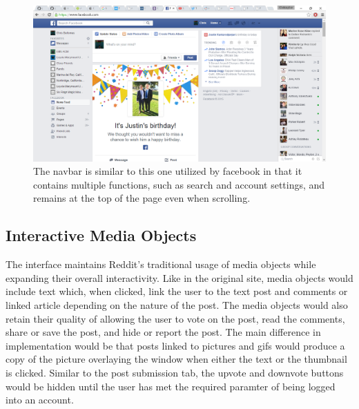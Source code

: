 \documentclass{article}
\begin{document}
\begin{figure}[H]
\begin{center}
\includegraphics[width=1\textwidth]{navbar.png}
\caption{The navbar is similar to this one utilized by facebook in that it contains multiple functions, such as search and account settings, and remains at the top of the page even when scrolling.}
\end{center}
\end{figure}

\subsection{Interactive Media Objects} The interface maintains Reddit's traditional usage of media objects while expanding their overall interactivity. Like in the original site, media objects would include text which, when clicked, link the user to the text post and comments or linked article depending on the nature of the post. The media objects would also retain their quality of allowing the user to vote on the post, read the comments, share or save the post, and hide or report the post. The main difference in implementation would be that posts linked to pictures and gifs would produce a copy of the picture overlaying the window when either the text or the thumbnail is clicked. Similar to the post submission tab, the upvote and downvote buttons would be hidden until the user has met the required paramter of being logged into an account.
\end{document}
